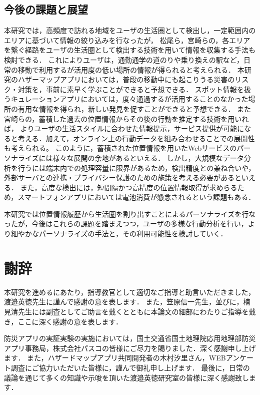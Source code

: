 \documentclass[a4paper]{jsarticle}
\begin{document}
\begin{enumerate}
\begin{enumerate}
\subsection{今後の課題と展望}
本研究では，高頻度で訪れる地域をユーザの生活圏として検出し，一定範囲内のエリアに基づいて情報の絞り込みを行なったが，
松尾ら，宮崎らの，各エリアを繋ぐ経路をユーザの生活圏として検出する技術\cite{matsuo}\cite{docomo}を用いて情報を収集する手法も検討できる．
これによりユーザは，通勤通学の道のりや乗り換えの駅など，日常の移動で利用するが活用度の低い場所の情報が得られると考えられる．
本研究のハザーマップアプリにおいては，普段の移動中にも起こりうる災害のリスク・対策を，事前に素早く学ぶことができると予想できる．
スポット情報を扱うキュレーションアプリにおいては，度々通過するが活用することのなかった場所の有用な情報を得られ，新しい発見を促すことができると予想できる．
また宮崎らの，蓄積した過去の位置情報からその後の行動を推定する技術\cite{docomo}を用いれば，
よりユーザの生活スタイルに合わせた情報提示，サービス提供が可能になると考える．加えて，オンライン上の行動データを組み合わせることでの展開性も考えられる。
このように，蓄積された位置情報を用いたWebサービスのパーソナライズには様々な展開の余地があるといえる．
しかし，大規模なデータ分析を行うには端末内での処理容量に限界があるため，検出精度との兼ね合いや，外部サーバとの連携・プライバシー保護のための施策を考える必要があるといえる．
また，高度な検出には，短間隔かつ高精度の位置情報取得が求めらるため，スマートフォンアプリにおいては電池消費が懸念されるという課題もある．

本研究では位置情報履歴から生活圏を割り出すことによるパーソナライズを行なったが，今後はこれらの課題を踏まえつつ，ユーザの多様な行動分析を行い，より細やかなパーソナライズの手法と，その利用可能性を検討していく．

\newpage
\section*{謝辞}
本研究を進めるにあたり，指導教官として適切なご指導と助言いただきました，渡邉英徳先生に謹んで感謝の意を表します．
また，笠原信一先生，並びに，楠見清先生には副査としてご助言を戴くとともに本論文の細部にわたりご指導を戴き，ここに深く感謝の意を表します．

防災アプリの実証実験の実施においては，国土交通省国土地理院応用地理部防災アプリ事務局，株式会社パスコの皆様にご尽力を賜りました．深く感謝申し上げます．
また，ハザードマップアプリ共同開発者の木村汐里さん，WEBアンケート調査にご協力いただいた皆様に，謹んで御礼申し上げます．
最後に，日常の議論を通じて多くの知識や示唆を頂いた渡邉英徳研究室の皆様に深く感謝致します．


\end{enumerate}
\end{enumerate}
\end{document}
